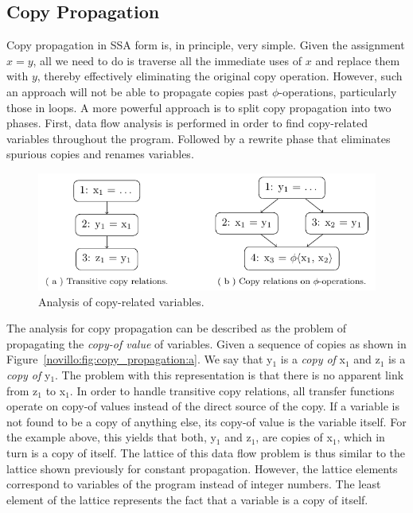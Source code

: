 \subsection{Copy Propagation}
\label{novillo:sec:copy-prop}

Copy propagation in SSA form is, in principle, very simple.  Given the
assignment \linebreak $x = y$, all we need to do is traverse all the immediate
uses of $x$ and replace them with $y$, thereby effectively eliminating the
original copy operation. However, such an approach will not be able to propagate
copies past $\phi$-operations, particularly those in loops. A more powerful
approach is to split copy propagation into two phases. First, data flow analysis
is performed in order to find copy-related variables throughout the program.
Followed by a rewrite phase that eliminates spurious copies and renames
variables.

\begin{figure}[b!]
  \begin{center}
    \includegraphics{copy_propagation}
    \subfloat{\label{novillo:fig:copy_propagation:a}}
    \subfloat{\label{novillo:fig:copy_propagation:b}}
  \end{center}
  \vspace{-1em}
  \caption{Analysis of copy-related variables.}
  \label{novillo:fig:copy_propagation}
\end{figure}

The analysis for copy propagation can be described as the problem of
propagating the \textit{copy-of value} of variables.  Given a sequence of
copies as shown in Figure~\ref{novillo:fig:copy_propagation:a}. We say that
y$_1$ is a \textit{copy of} x$_1$ and z$_1$ is a \textit{copy of} y$_1$.  The
problem with this representation is that there is no apparent link from z$_1$ to
x$_1$.  In order to handle transitive copy relations, all transfer functions
operate on copy-of values instead of the direct source of the copy.  If a
variable is not found to be a copy of anything else, its copy-of value is the
variable itself. For the example above, this yields that both, y$_1$ and z$_1$,
are copies of x$_1$, which in turn is a copy of itself. The lattice of this data
flow problem is thus similar to the lattice shown previously for constant
propagation. However, the lattice elements correspond to variables of the
program instead of integer numbers. The least element of the lattice
represents the fact that a variable is a copy of itself.

